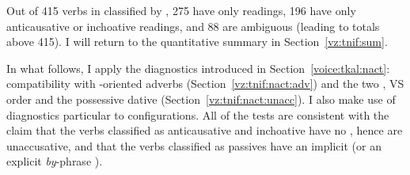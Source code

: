 Out of 415 verbs in {\tnif} classified by \cite{ahdoutkastner19nels}, 275 have only  readings, 196 have only anticausative or inchoative readings, and 88 are ambiguous (leading to totals above 415). I will return to the quantitative summary in Section~\ref{vz:tnif:sum}.

In what follows, I apply the diagnostics introduced in Section~\ref{voice:tkal:nact}: compatibility with -oriented adverbs (Section~\ref{vz:tnif:nact:adv}) and the two , VS order and the possessive dative (Section~\ref{vz:tnif:nact:unacc}). I also make use of diagnostics particular to  configurations. All of the tests are consistent with the claim that the verbs classified as anticausative and inchoative have no , hence are unaccusative, and that the verbs classified as passives have an implicit  (or an explicit \emph{by}-phrase ).

